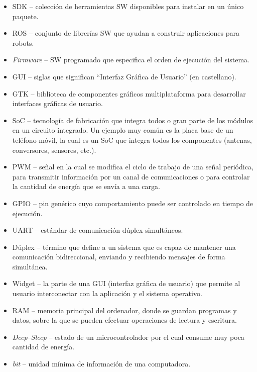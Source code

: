 \begin{itemize}
    \item \ac{SDK} -- colección de herramientas \ac{SW} disponibles para instalar en un único paquete.
    \item \ac{ROS} -- conjunto de librerías \ac{SW} que ayudan a construir aplicaciones para robots.
    \item \textit{Firmware} -- \ac{SW} programado que especifica el orden de ejecución del sistema.
    \item \ac{GUI} -- siglas que significan ``Interfaz Gráfica de Usuario'' (en castellano).
    \item \ac{GTK} -- biblioteca de componentes gráficos multiplataforma para desarrollar interfaces gráficas de usuario.
    \item \ac{SoC} -- tecnología de fabricación que integra todos o gran parte de los módulos en un circuito integrado. Un ejemplo muy común es la placa base de un teléfono móvil, la cual es un \ac{SoC} que integra todos los componentes (antenas, conversores, sensores, etc.).
    \item \ac{PWM} -- señal en la cual se modifica el ciclo de trabajo de una señal periódica, para transmitir información por un canal de comunicaciones o para controlar la cantidad de energía que se envía a una carga.
    \item \ac{GPIO} -- pin genérico cuyo comportamiento puede ser controlado en tiempo de ejecución.
    \item \ac{UART} -- estándar de comunicación dúplex simultáneos.
    \item Dúplex -- término que define a un sistema que es capaz de mantener una comunicación bidireccional, enviando y recibiendo mensajes de forma simultánea.
    \item Widget -- la parte de una GUI (interfaz gráfica de usuario) que permite al usuario interconectar con la aplicación y el sistema operativo.
    \item \ac{RAM} -- memoria principal del ordenador, donde se guardan programas y datos, sobre la que se pueden efectuar operaciones de lectura y escritura.
    \item \textit{Deep--Sleep} -- estado de un microcontrolador por el cual consume muy poca cantidad de energía.
    \item \textit{bit} -- unidad mínima de información de una computadora.
\end{itemize}
